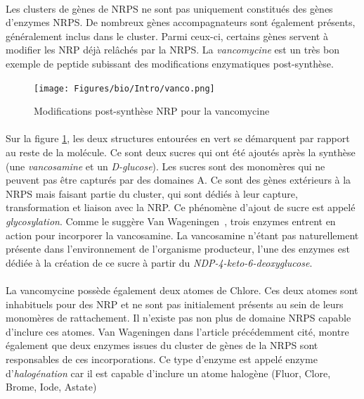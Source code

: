 \documentclass[12pt,french,twoside]{report}
\begin{document}
\label{sucres}

\paragraph{}Les clusters de gènes de NRPS ne sont pas uniquement constitués des gènes d'enzymes NRPS.
De nombreux gènes accompagnateurs sont également présents, généralement inclus dans le cluster.
Parmi ceux-ci, certains gènes servent à modifier les NRP déjà relâchés par la NRPS.
La \textit{vancomycine} est un très bon exemple de peptide subissant des modifications enzymatiques post-synthèse.

\begin{figure}[h!]
  \begin{center}
    \texttt{[image: Figures/bio/Intro/vanco.png]}
    \caption{\label{vanco}Modifications post-synthèse NRP pour la vancomycine}
  \end{center}
\end{figure}

\paragraph{}Sur la figure \ref{vanco}, les deux structures entourées en vert se démarquent par rapport au reste de la molécule.
Ce sont deux sucres qui ont été ajoutés après la synthèse (une \textit{vancosamine} et un \textit{D-glucose}).
Les sucres sont des monomères qui ne peuvent pas être capturés par des domaines A.
Ce sont des gènes extérieurs à la NRPS mais faisant partie du cluster, qui sont dédiés à leur capture, transformation et liaison avec la NRP.
Ce phénomène d'ajout de sucre est appelé \textit{glycosylation}.
Comme le suggère Van Wageningen~\cite{van_wageningen_sequencing_1998}, trois enzymes entrent en action pour incorporer la vancosamine.
La vancosamine n'étant pas naturellement présente dans l'environnement de l'organisme producteur, l'une des enzymes est dédiée à la création de ce sucre à partir du \textit{NDP-4-keto-6-deoxyglucose}.

\paragraph{}La vancomycine possède également deux atomes de Chlore.
Ces deux atomes sont inhabituels pour des NRP et ne sont pas initialement présents au sein de leurs monomères de rattachement.
Il n'existe pas non plus de domaine NRPS capable d'inclure ces atomes.
Van Wageningen dans l'article précédemment cité, montre également que deux enzymes issues du cluster de gènes de la NRPS sont responsables de ces incorporations.
Ce type d'enzyme est appelé enzyme d'\textit{halogénation} car il est capable d'inclure un atome halogène (Fluor, Clore, Brome, Iode, Astate)
\end{document}

